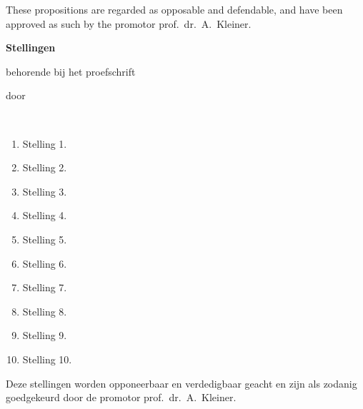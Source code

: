 \documentclass{dissertation}
\begin{document}
\bigskip
\bigskip

\begin{center}
These propositions are regarded as opposable and defendable, and have been approved as such by the promotor prof.\ dr.\ A.\ Kleiner.
\end{center}

\clearpage
{

\begin{center}

{\Large\titlefont\bfseries Stellingen}

\bigskip

behorende bij het proefschrift

\bigskip

{\makeatletter
\titlestyle\bfseries\large\@title
\makeatother}

{\makeatletter
\ifx\@subtitle\undefined\else
    \titlefont\titleshape\@subtitle
\fi
\makeatother}

\bigskip

door

\bigskip

\makeatletter
{\large\titlefont\bfseries\@firstname\ {\titleshape\@lastname}}
\makeatother

\end{center}

\bigskip
\bigskip

\begin{enumerate}

\item Stelling 1.
\item Stelling 2.
\item Stelling 3.
\item Stelling 4.
\item Stelling 5.
\item Stelling 6.
\item Stelling 7.
\item Stelling 8.
\item Stelling 9.
\item Stelling 10.

\end{enumerate}

\bigskip
\bigskip

\begin{center}
Deze stellingen worden opponeerbaar en verdedigbaar geacht en zijn als zodanig goedgekeurd door de promotor prof.\ dr.\ A.\ Kleiner.
\end{center}

}
\end{document}
